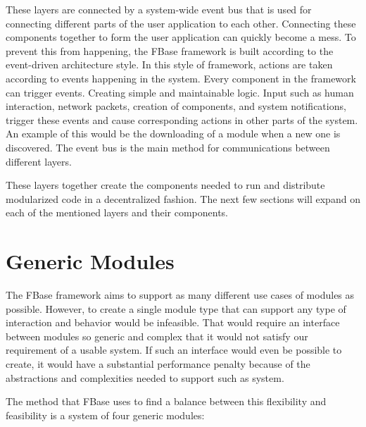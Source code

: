 These layers are connected by a system-wide event bus that is used for connecting different parts of the user application to each other. Connecting these components together to form the user application can quickly become a mess. To prevent this from happening, the FBase framework is built according to the event-driven architecture style. In this style of framework, actions are taken according to events happening in the system. Every component in the framework can trigger events. Creating simple and maintainable logic. Input such as human interaction, network packets, creation of components, and system notifications, trigger these events and cause corresponding actions in other parts of the system. An example of this would be the downloading of a module when a new one is discovered. The event bus is the main method for communications between different layers.

These layers together create the components needed to run and distribute modularized code in a decentralized fashion. The next few sections will expand on each of the mentioned layers and their components.

\section{Generic Modules}

The FBase framework aims to support as many different use cases of modules as possible. However, to create a single module type that can support any type of interaction and behavior would be infeasible. That would require an interface between modules so generic and complex that it would not satisfy our requirement of a usable system. If such an interface would even be possible to create, it would have a substantial performance penalty because of the abstractions and complexities needed to support such as system.

The method that FBase uses to find a balance between this flexibility and feasibility is a system of four generic modules:

